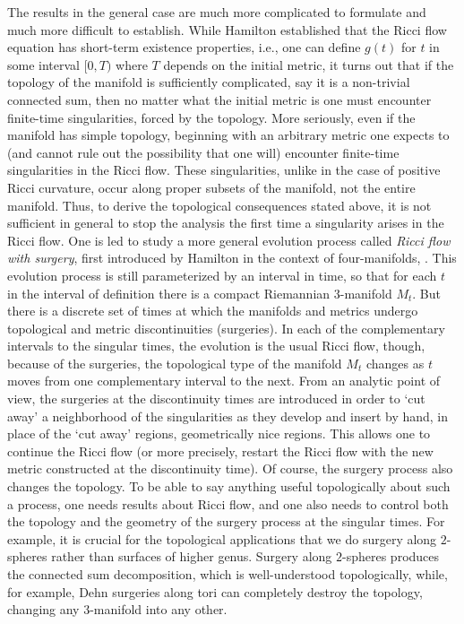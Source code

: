 The results in the general case are much more complicated to
formulate and much more difficult to establish. While Hamilton
established that the Ricci flow equation  has short-term existence
properties, i.e., one can  define $g(t)$ for $t$ in some interval
$[0,T)$ where $T$ depends on the initial metric, it turns out that
if the topology of the manifold is sufficiently complicated, say it
is a non-trivial connected sum, then no matter what the initial
metric is one must encounter finite-time singularities, forced by
the topology. More seriously, even if the manifold has simple
topology, beginning with an arbitrary metric one expects to (and
cannot rule out the possibility that one will) encounter finite-time
singularities in the Ricci flow. These singularities, unlike in the
case of positive Ricci curvature, occur along proper subsets of the
manifold, not the entire manifold.
 Thus, to derive the topological
consequences stated above, it is not sufficient in general to stop
the analysis the first time a singularity arises in the Ricci flow.
One is led to study a more general evolution process
 called {\em Ricci flow with surgery},
 first introduced by Hamilton in the context
 of four-manifolds, \cite{Hamilton4MPIC}.
 This evolution process
 is still parameterized by an interval in time, so that for each $t$
 in the interval of definition there is a compact Riemannian $3$-manifold
 $M_t$. But there is a discrete set of
times at which the manifolds and metrics undergo topological and
metric discontinuities (surgeries). In each of the complementary
intervals to the singular times, the evolution is the usual Ricci
flow, though, because of the surgeries, the topological type of the
manifold $M_t$ changes as $t$ moves from one complementary interval
to the next. From an analytic point of view, the surgeries at the
discontinuity times are introduced in order to `cut away' a
neighborhood of the singularities as they develop and insert by
hand, in place of the `cut away' regions,  geometrically nice
regions. This allows one to continue  the Ricci flow (or more
precisely, restart the Ricci flow with the new metric constructed at
the discontinuity time). Of course, the surgery process also changes
the topology. To be able to say anything useful topologically about
such a process, one needs results about Ricci flow, and one also
needs to control both the topology and the geometry of the surgery
process at the singular times. For example, it is crucial for the
topological applications that we do surgery along $2$-spheres rather
than surfaces of higher genus. Surgery along $2$-spheres produces
the connected sum decomposition, which is well-understood
topologically, while, for example, Dehn surgeries along tori can
completely destroy the topology, changing any $3$-manifold into any
other.

